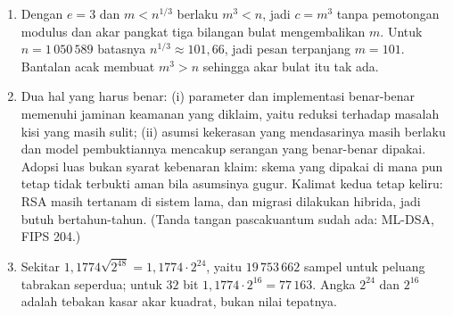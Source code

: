 \begin{enumerate}[label=\textbf{31.\arabic*}]
  \item Dengan $e=3$ dan $m<n^{1/3}$ berlaku $m^{3}<n$, jadi $c=m^{3}$ tanpa
        pemotongan modulus dan akar pangkat tiga bilangan bulat mengembalikan $m$.
        Untuk $n=1\,050\,589$ batasnya $n^{1/3}\approx101{,}66$, jadi pesan
        terpanjang $m=101$. Bantalan acak membuat $m^{3}>n$ sehingga akar bulat itu
        tak ada.

  \item Dua hal yang harus benar: (i) parameter dan implementasi benar-benar
        memenuhi jaminan keamanan yang diklaim, yaitu reduksi terhadap masalah
        kisi yang masih sulit; (ii) asumsi kekerasan yang mendasarinya masih
        berlaku dan model pembuktiannya mencakup serangan yang benar-benar dipakai.
        Adopsi luas bukan syarat kebenaran klaim: skema yang dipakai di mana pun
        tetap tidak terbukti aman bila asumsinya gugur.
        Kalimat kedua tetap keliru: RSA masih tertanam di sistem lama, dan migrasi
        dilakukan hibrida, jadi butuh bertahun-tahun. (Tanda tangan pascakuantum
        sudah ada: ML-DSA, FIPS 204.)

  \item Sekitar $1{,}1774\sqrt{2^{48}}=1{,}1774\cdot2^{24}$, yaitu $19\,753\,662$
        sampel untuk peluang tabrakan seperdua; untuk $32$ bit
        $1{,}1774\cdot2^{16}=77\,163$. Angka $2^{24}$ dan $2^{16}$ adalah tebakan
        kasar akar kuadrat, bukan nilai tepatnya.
\end{enumerate}

